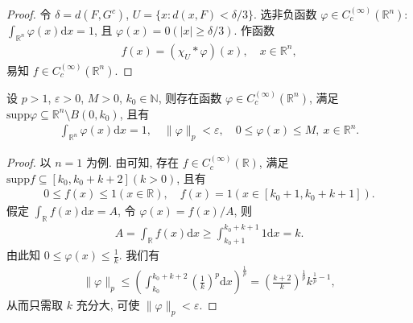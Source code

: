 \documentclass[../../main.tex]{subfiles}%
\begin{document}
\begin{proof}
令 $\delta=d(F,G^c)$, $U=\{x: d(x,F)<\delta/3\}$. 选非负函数 $\varphi\in C_c^{(\infty)}(\mathbb{R}^n)$: $\int_{\mathbb{R}^n} \varphi(x) \mathrm{d}x=1$, 且 $\varphi(x)=0(|x|\geqslant \delta/3)$. 作函数
\begin{align*}
f(x) = (\chi_U * \varphi)(x), \quad x\in \mathbb{R}^n,
\end{align*}
易知 $f\in C_c^{(\infty)}(\mathbb{R}^n)$.
\end{proof}

\begin{corollary}
设 $p>1$, $\varepsilon>0$, $M>0$, $k_0\in \mathbb{N}$, 则存在函数 $\varphi\in C_c^{(\infty)}(\mathbb{R}^n)$, 满足 $\mathrm{supp}\varphi\subseteq \mathbb{R}^n\setminus B(0,k_0)$, 且有
\begin{align*}
\int_{\mathbb{R}^n} \varphi(x) \mathrm{d}x=1, \quad \|\varphi\|_p < \varepsilon, \quad 0\leqslant \varphi(x)\leqslant M, \ x\in \mathbb{R}^n.
\end{align*}
\end{corollary}
\begin{proof}
以 $n=1$ 为例. 由可知, 存在 $f\in C_c^{(\infty)}(\mathbb{R})$, 满足 $\mathrm{supp}f\subseteq [k_0,k_0+k+2](k>0)$, 且有
\begin{align*}
0\leqslant f(x)\leqslant 1(x\in \mathbb{R}), \quad f(x)=1(x\in [k_0+1,k_0+k+1]).
\end{align*}
假定 $\int_{\mathbb{R}} f(x) \mathrm{d}x=A$, 令 $\varphi(x)=f(x)/A$, 则
\begin{align*}
A = \int_{\mathbb{R}} f(x) \mathrm{d}x \geqslant \int_{k_0+1}^{k_0+k+1} 1 \mathrm{d}x = k.
\end{align*}
由此知 $0\leqslant \varphi(x)\leqslant \frac{1}{k}$. 我们有
\begin{align*}
\|\varphi\|_p \leqslant \left( \int_{k_0}^{k_0+k+2} \left( \frac{1}{k} \right)^p \mathrm{d}x \right)^{\frac{1}{p}} = \left( \frac{k+2}{k} \right)^{\frac{1}{p}} k^{\frac{1}{p}-1},
\end{align*}
从而只需取 $k$ 充分大, 可使 $\|\varphi\|_p<\varepsilon$.
\end{proof}
\end{document}
